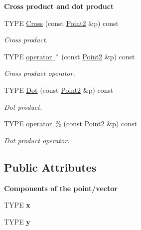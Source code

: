 \begin{Indent}\textbf{ Cross product and dot product}\par
\begin{DoxyCompactItemize}
\item 
\mbox{\label{classcy_1_1_point2_a8250ad01a056f085c24f7fd20082da15}} 
T\+Y\+PE \mbox{\hyperlink{classcy_1_1_point2_a8250ad01a056f085c24f7fd20082da15}{Cross}} (const \mbox{\hyperlink{classcy_1_1_point2}{Point2}} \&p) const
\begin{DoxyCompactList}\small\item\em Cross product. \end{DoxyCompactList}\item 
\mbox{\label{classcy_1_1_point2_a2074a70132528c486ad4420ae74e52dd}} 
T\+Y\+PE \mbox{\hyperlink{classcy_1_1_point2_a2074a70132528c486ad4420ae74e52dd}{operator $^\wedge$}} (const \mbox{\hyperlink{classcy_1_1_point2}{Point2}} \&p) const
\begin{DoxyCompactList}\small\item\em Cross product operator. \end{DoxyCompactList}\item 
\mbox{\label{classcy_1_1_point2_aa6e888ac50d60b1e620226448787377b}} 
T\+Y\+PE \mbox{\hyperlink{classcy_1_1_point2_aa6e888ac50d60b1e620226448787377b}{Dot}} (const \mbox{\hyperlink{classcy_1_1_point2}{Point2}} \&p) const
\begin{DoxyCompactList}\small\item\em Dot product. \end{DoxyCompactList}\item 
\mbox{\label{classcy_1_1_point2_a1ecee5a5fb039327de2fbe100750c4b3}} 
T\+Y\+PE \mbox{\hyperlink{classcy_1_1_point2_a1ecee5a5fb039327de2fbe100750c4b3}{operator \%}} (const \mbox{\hyperlink{classcy_1_1_point2}{Point2}} \&p) const
\begin{DoxyCompactList}\small\item\em Dot product operator. \end{DoxyCompactList}\end{DoxyCompactItemize}
\end{Indent}
\subsection*{Public Attributes}
\begin{Indent}\textbf{ Components of the point/vector}\par
\begin{DoxyCompactItemize}
\item 
\mbox{\label{classcy_1_1_point2_a2009b1625146ec828f3199b9a48f48f9}} 
T\+Y\+PE {\bfseries x}
\item 
\mbox{\label{classcy_1_1_point2_a38448053e83523b8e3fc46242766fa6d}} 
T\+Y\+PE {\bfseries y}
\end{DoxyCompactItemize}
\end{Indent}
